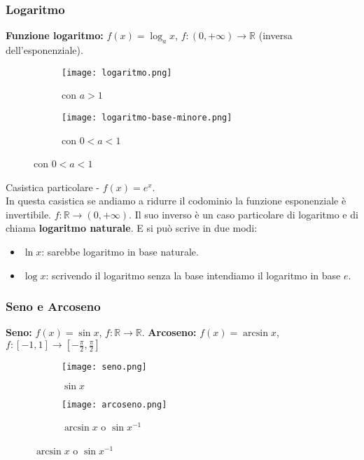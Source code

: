 \subsubsection{Logaritmo}
\textbf{Funzione logaritmo:} $f(x) = \log_a x$, \: \: $f: (0, +\infty) \longrightarrow \mathbb{R}$ \: \: (inversa dell'esponenziale).
\begin{figure}[h!]
    \begin{subfigure}{.5\textwidth}
        \centering
        \texttt{[image: logaritmo.png]}
        \caption{con $a > 1$}
        \label{fig:logaritmo}
    \end{subfigure}
    \begin{subfigure}{.5\textwidth}
        \centering
        \texttt{[image: logaritmo-base-minore.png]}
        \caption{con $0 < a < 1$}
        \label{fig:logaritmo-base-minore}
    \end{subfigure}
\end{figure}
\begin{observation}
    Casistica particolare - $f(x) = e^x$.\\
    In questa casistica se andiamo a ridurre il codominio la funzione esponenziale è invertibile. $f: \mathbb{R} \longrightarrow (0, +\infty)$.
    Il suo inverso è un caso particolare di logaritmo e di chiama \textbf{logaritmo naturale}. E si può scrive in due modi:
    \begin{itemize}
        \item $\ln{x}$: sarebbe logaritmo in base naturale.
        \item $\log x$: scrivendo il logaritmo senza la base intendiamo il logaritmo in base $e$.
    \end{itemize}
\end{observation}

\subsubsection{Seno e Arcoseno}
\textbf{Seno:} $f(x) = \sin x$, $f: \mathbb{R} \longrightarrow \mathbb{R}$. \hfill
\textbf{Arcoseno:} $f(x) = \arcsin x$, $f: [-1, 1] \longrightarrow [-\frac{\pi}{2}, \frac{\pi}{2}]$
\begin{figure}[h!]
    \begin{subfigure}{.5\textwidth}
        \centering
        \texttt{[image: seno.png]}
        \caption{$\sin{x}$}
        \label{fig:seno}
    \end{subfigure}
    \begin{subfigure}{.5\textwidth}
        \centering
        \texttt{[image: arcoseno.png]}
        \caption{$\arcsin{x}$ o $\sin{x}^{-1}$}
        \label{fig:arcoseno}
    \end{subfigure}
\end{figure}

